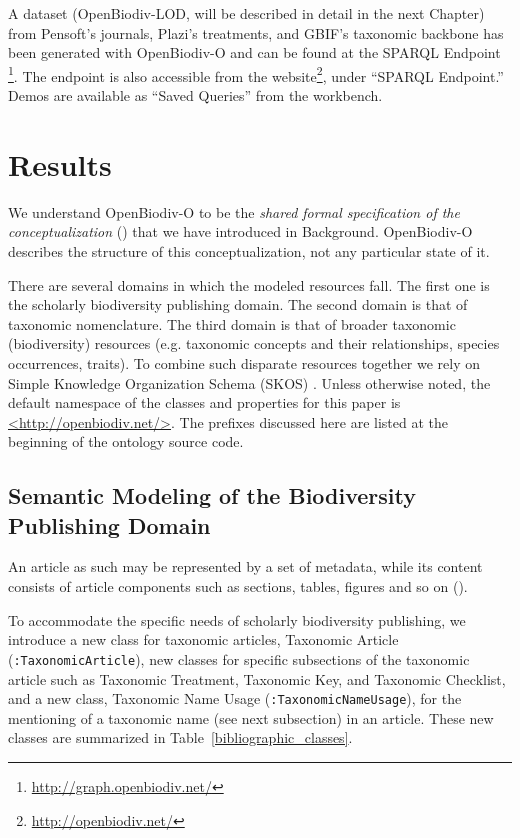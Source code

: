 A dataset (OpenBiodiv-LOD, will be described in detail in the next Chapter) from Pensoft's journals, Plazi's treatments, and GBIF's taxonomic backbone has been generated with \mbox{OpenBiodiv-O} and can be found at the SPARQL Endpoint \footnote{\href{http://graph.openbiodiv.net/}{http://graph.openbiodiv.net/}}. The endpoint is also accessible from the website\footnote{\href{http://openbiodiv.net/}{http://openbiodiv.net/}}, under ``SPARQL Endpoint.'' Demos are available as ``Saved Queries'' from the workbench.

\section{Results}

We understand \mbox{OpenBiodiv-O} to be the \emph{shared formal specification of the conceptualization} (\cite{gruber_translation_1993,obitko_translations_2007,staab_handbook_2009}) that we have introduced in Background. \mbox{OpenBiodiv-O} describes the structure of this conceptualization, not any particular state of it.

There are several domains in which the modeled resources fall. The first one is the scholarly biodiversity publishing domain. The second domain is that of taxonomic nomenclature. The third domain is that of broader taxonomic (biodiversity) resources (e.g. taxonomic concepts and their relationships, species occurrences, traits). To combine such disparate resources together we rely on Simple Knowledge Organization Schema (SKOS) \cite{miles_skos_nodate}. Unless otherwise noted, the default namespace of the classes and properties for this paper is \url{<http://openbiodiv.net/>}. The prefixes discussed here are listed at the beginning of the ontology source code.

\subsection{Semantic Modeling of the Biodiversity Publishing Domain}

An article as such may be represented by a set of metadata, while its content consists of article components such as sections, tables, figures and so on (\cite{peroni_example_2015}).

To accommodate the specific needs of scholarly biodiversity publishing, we introduce a new class for taxonomic articles, Taxonomic Article ({\tt :TaxonomicArticle}), new classes for specific subsections of the taxonomic
article such as Taxonomic Treatment, Taxonomic Key, and Taxonomic Checklist, and a new class, Taxonomic Name Usage ({\tt :TaxonomicNameUsage}), for the mentioning of a taxonomic name (see next subsection) in an article. These new classes are summarized in Table~\ref{bibliographic_classes}.

